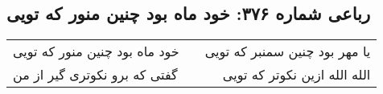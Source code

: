 \begin{center}
\section*{رباعی شماره ۳۷۶: خود ماه بود چنین منور که تویی}
\label{sec:sh376}
\begin{longtable}{l p{0.5cm} r}
خود ماه بود چنین منور که تویی
&&
یا مهر بود چنین سمنبر که تویی
\\
گفتی که برو نکوتری گیر از من
&&
الله الله ازین نکوتر که تویی
\\
\end{longtable}
\end{center}
